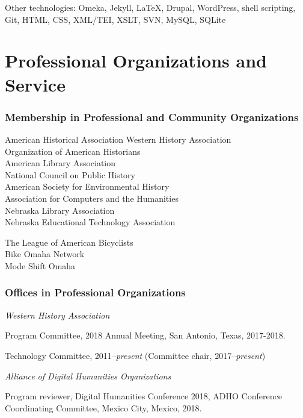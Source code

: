 Other technologies: Omeka, Jekyll, \LaTeX, Drupal, WordPress, shell
scripting, Git, HTML, CSS, XML/TEI, XSLT, SVN, MySQL, SQLite

\section{Professional Organizations and
Service}\label{professional-organizations-and-service}

\subsubsection{Membership in Professional and Community
Organizations}\label{membership-in-professional-and-community-organizations}

American Historical Association Western History Association\\
Organization of American Historians\\
American Library Association\\
National Council on Public History\\
American Society for Environmental History\\
Association for Computers and the Humanities\\
Nebraska Library Association\\
Nebraska Educational Technology Association

The League of American Bicyclists\\
Bike Omaha Network\\
Mode Shift Omaha

\subsubsection{Offices in Professional
Organizations}\label{offices-in-professional-organizations}

\emph{Western History Association}

Program Committee, 2018 Annual Meeting, San Antonio, Texas, 2017-2018.

Technology Committee, 2011--\emph{present} (Committee chair,
2017--\emph{present})

\vspace{.4cm}

\emph{Alliance of Digital Humanities Organizations}

Program reviewer, Digital Humanities Conference 2018, ADHO Conference
Coordinating Committee, Mexico City, Mexico, 2018.

